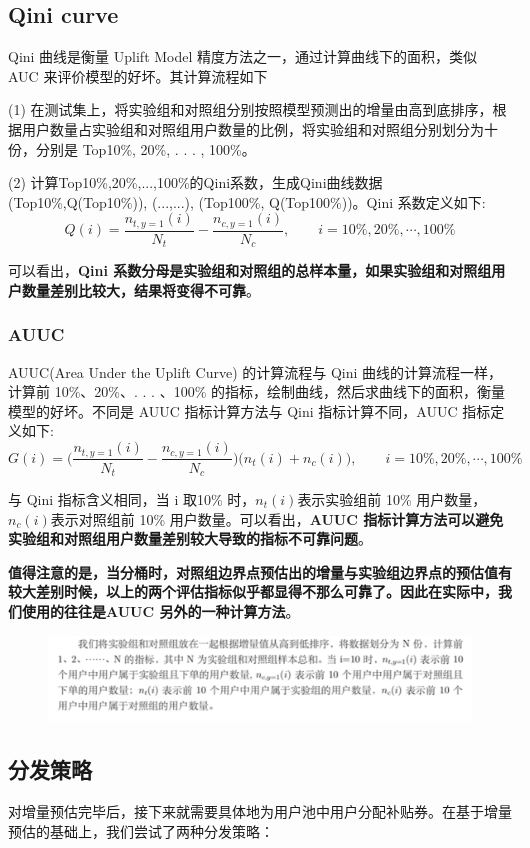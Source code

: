 \documentclass[12pt]{article}
\begin{document}
\subsection{Qini curve}
Qini 曲线是衡量 Uplift Model 精度方法之一，通过计算曲线下的面积，类似 AUC 来评价模型的好坏。其计算流程如下

(1) 在测试集上，将实验组和对照组分别按照模型预测出的增量由高到底排序，根据用户数量占实验组和对照组用户数量的比例，将实验组和对照组分别划分为十份，分别是 Top10\%, 20\%, . . . , 100\%。

(2) 计算Top10\%,20\%,...,100\%的Qini系数，生成Qini曲线数据(Top10\%,Q(Top10\%)),
(...,...), (Top100\%, Q(Top100\%))。Qini 系数定义如下:
$$
Q(i) = \frac{n_{t,y=1}(i)}{N_t} - \frac{n_{c,y=1}(i)}{N_c}, \qquad i = 10\%, 20\%, \cdots, 100\%
$$

可以看出，\textbf{Qini 系数分母是实验组和对照组的总样本量，如果实验组和对照组用户数量差别比较大，结果将变得不可靠}。

\subsubsection{AUUC}
AUUC(Area Under the Uplift Curve) 的计算流程与 Qini 曲线的计算流程一样，计算前 10\%、20\%、. . . 、100\% 的指标，绘制曲线，然后求曲线下的面积，衡量模型的好坏。不同是 AUUC 指标计算方法与 Qini 指标计算不同，AUUC 指标定义如下:
$$
G(i) = \Big( \frac{n_{t,y=1}(i)}{N_t} - \frac{n_{c,y=1}(i)}{N_c} \Big)\Big(n_t(i) + n_c(i)\Big), \qquad i = 10\%, 20\%, \cdots, 100\%
$$

与 Qini 指标含义相同，当 i 取10\% 时，$n_t(i)$表示实验组前 10\% 用户数量，$n_c(i)$表示对照组前 10\% 用户数量。可以看出，\textbf{AUUC 指标计算方法可以避免实验组和对照组用户数量差别较大导致的指标不可靠问题}。

\textbf{值得注意的是，当分桶时，对照组边界点预估出的增量与实验组边界点的预估值有较大差别时候，以上的两个评估指标似乎都显得不那么可靠了。因此在实际中，我们使用的往往是AUUC 另外的一种计算方法}。
\begin{figure}[H]
    \centering
    \includegraphics[width=1\textwidth]{fig/Casual_Inference_In_Didi_16.png}
\end{figure}

\subsection{分发策略}
对增量预估完毕后，接下来就需要具体地为用户池中用户分配补贴券。在基于增量预估的基础上，我们尝试了两种分发策略：
\end{document}
